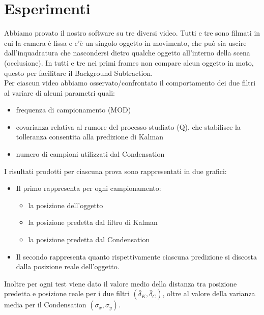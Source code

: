 
\section{Esperimenti}\label{sec:esperimenti}

Abbiamo provato il nostro software su tre diversi video. Tutti e tre sono filmati in cui la camera è fissa e c'è un singolo oggetto in movimento, che può sia uscire dall'inquadratura che nascondersi dietro qualche oggetto all'interno della scena (occlusione). In tutti e tre nei primi frames  non compare alcun oggetto in moto, questo per facilitare il Background Subtraction.\\

Per ciascun video abbiamo osservato/confrontato il comportamento dei due filtri al variare di alcuni parametri quali:
\begin{itemize}
\item frequenza di campionamento (MOD)
\item covarianza relativa al rumore del processo studiato (Q), che stabilisce la tolleranza consentita alla predizione di Kalman
\item numero di campioni utilizzati dal Condensation\\
\end{itemize}

I risultati prodotti per ciascuna prova sono rappresentati in due grafici:
\begin{itemize}
\item Il primo rappresenta per ogni campionamento:
\begin{itemize}
\item la posizione dell'oggetto
\item la posizione predetta dal filtro di Kalman
\item la posizione predetta dal Condensation
\end{itemize}
\item Il secondo rappresenta quanto rispettivamente ciascuna predizione si discosta dalla posizione reale dell'oggetto.
\end{itemize}

Inoltre per ogni test viene dato il valore medio della distanza tra posizione predetta e posizione reale per i due filtri \begin{math}(\bar \delta_K, \bar \delta_C)\end{math}, oltre al valore della varianza media per il Condensation \begin{math}(\sigma_x,\sigma_y)\end{math}.

